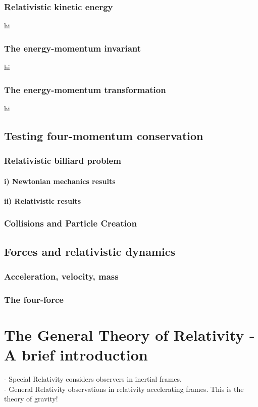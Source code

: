 \documentclass[a4paper,11pt]{article}
\numberwithin{equation}{section}
\begin{document}
  \subsubsection{Relativistic kinetic energy}
  hi
  \subsubsection{The energy-momentum invariant}
  hi
  \subsubsection{The energy-momentum transformation}
  hi
 
 \subsection{Testing four-momentum conservation}
 \subsubsection{Relativistic billiard problem}
 \paragraph{i) Newtonian mechanics results}
 \paragraph{ii) Relativistic results}
 \subsubsection{Collisions and Particle Creation}
 
 \subsection{Forces and relativistic dynamics}
 \subsubsection{Acceleration, velocity, mass}
 \subsubsection{The four-force}
 
  \newpage
 
 \section{The General Theory of Relativity - A brief introduction}
 - Special Relativity considers observers in inertial frames.\\
 - General Relativity observations in relativity accelerating frames. This is the theory of gravity!
 
\end{document}

